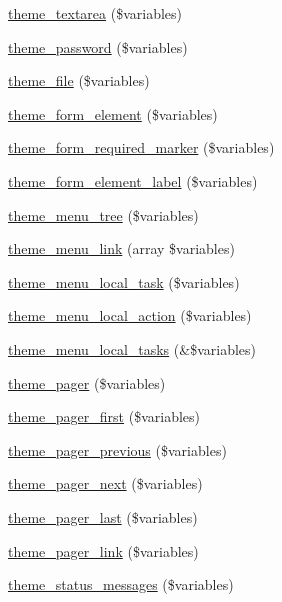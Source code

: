 \begin{DoxyCompactItemize}
\hyperlink{group__themeable_ga39add5682e6e4a90866a9337d81cfa94}{theme\_\-textarea} (\$variables)
\item 
\hyperlink{group__themeable_gabef0b99822b6dcb684b2a447f49a8086}{theme\_\-password} (\$variables)
\item 
\hyperlink{group__themeable_ga4c1b5b57f578c1441e27f53733074af8}{theme\_\-file} (\$variables)
\item 
\hyperlink{group__themeable_gafa399c53da3c042edf3863f222d036aa}{theme\_\-form\_\-element} (\$variables)
\item 
\hyperlink{group__themeable_gaa83136018b3c3b40bacae97fe3abcb17}{theme\_\-form\_\-required\_\-marker} (\$variables)
\item 
\hyperlink{group__themeable_gaf3ba527e41db52bfb82c3fc42207540d}{theme\_\-form\_\-element\_\-label} (\$variables)
\item 
\hyperlink{group__themeable_ga33100f9d25d899b017bda922086f7358}{theme\_\-menu\_\-tree} (\$variables)
\item 
\hyperlink{group__themeable_ga60ee17f550a787c90d1452f6bbe98a56}{theme\_\-menu\_\-link} (array \$variables)
\item 
\hyperlink{group__themeable_gacf0d36288bfdf480eb55328d74f65b9c}{theme\_\-menu\_\-local\_\-task} (\$variables)
\item 
\hyperlink{group__themeable_ga192701ba5ebb20f4d315f84baaf6689e}{theme\_\-menu\_\-local\_\-action} (\$variables)
\item 
\hyperlink{group__themeable_ga86d3fc6b53bc1455c044e181b0501da0}{theme\_\-menu\_\-local\_\-tasks} (\&\$variables)
\item 
\hyperlink{group__themeable_ga3bfc8e62230af3fb60b061ee67c6d045}{theme\_\-pager} (\$variables)
\item 
\hyperlink{group__themeable_gaffa784c4dec5d4263179d003782aeb4d}{theme\_\-pager\_\-first} (\$variables)
\item 
\hyperlink{group__themeable_gae703c543e6dbae14df5da1451d6eaf03}{theme\_\-pager\_\-previous} (\$variables)
\item 
\hyperlink{group__themeable_ga36f1c652a53b2d4df284cdae21dc87a0}{theme\_\-pager\_\-next} (\$variables)
\item 
\hyperlink{group__themeable_ga906e18f1c174adbec2076cc886f8a102}{theme\_\-pager\_\-last} (\$variables)
\item 
\hyperlink{group__themeable_ga1f17f9bb29c5c0d1b58ff4cba8e2499a}{theme\_\-pager\_\-link} (\$variables)
\item 
\hyperlink{group__themeable_gad29a18ad4d19a5fc0a3c75a8804f0331}{theme\_\-status\_\-messages} (\$variables)

\end{DoxyCompactItemize}
